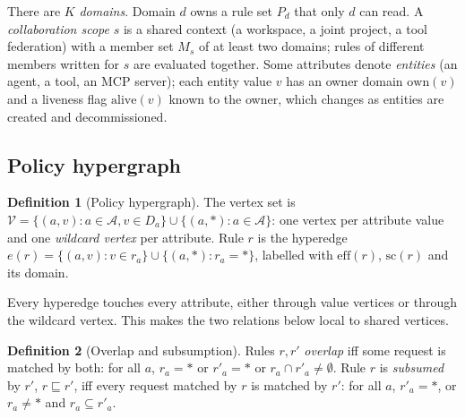 \documentclass[preprint,12pt]{elsarticle}
\theoremstyle{definition}
\newtheorem{definition}{Definition}
\newcommand{\eff}{\mathrm{eff}}
\newcommand{\scp}{\mathrm{sc}}
\begin{document}
There are $K$ \emph{domains}. Domain $d$ owns a rule set $P_d$ that only $d$ can read. A \emph{collaboration scope} $s$ is a shared context (a workspace, a joint project, a tool federation) with a member set $M_s$ of at least two domains; rules of different members written for $s$ are evaluated together. Some attributes denote \emph{entities} (an agent, a tool, an MCP server); each entity value $v$ has an owner domain $\mathrm{own}(v)$ and a liveness flag $\mathrm{alive}(v)$ known to the owner, which changes as entities are created and decommissioned.

\subsection{Policy hypergraph}
\begin{definition}[Policy hypergraph]
The vertex set is $\mathcal{V}=\{(a,v): a\in\mathcal{A}, v\in D_a\}\cup\{(a,\ast):a\in\mathcal{A}\}$: one vertex per attribute value and one \emph{wildcard vertex} per attribute. Rule $r$ is the hyperedge $e(r)=\{(a,v): v\in r_a\}\cup\{(a,\ast): r_a=\ast\}$, labelled with $\eff(r)$, $\scp(r)$ and its domain.
\end{definition}
Every hyperedge touches every attribute, either through value vertices or through the wildcard vertex. This makes the two relations below local to shared vertices.

\begin{definition}[Overlap and subsumption]
Rules $r,r'$ \emph{overlap} iff some request is matched by both: for all $a$, $r_a=\ast$ or $r'_a=\ast$ or $r_a\cap r'_a\neq\emptyset$. Rule $r$ is \emph{subsumed} by $r'$, $r\sqsubseteq r'$, iff every request matched by $r$ is matched by $r'$: for all $a$, $r'_a=\ast$, or $r_a\neq\ast$ and $r_a\subseteq r'_a$.
\end{definition}
\end{document}
